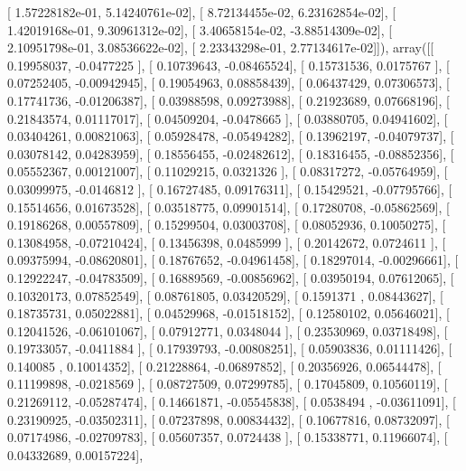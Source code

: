 \documentclass{article}
\begin{document}
       [  1.57228182e-01,   5.14240761e-02],
       [  8.72134455e-02,   6.23162854e-02],
       [  1.42019168e-01,   9.30961312e-02],
       [  3.40658154e-02,  -3.88514309e-02],
       [  2.10951798e-01,   3.08536622e-02],
       [  2.23343298e-01,   2.77134617e-02]]), array([[ 0.19958037, -0.0477225 ],
       [ 0.10739643, -0.08465524],
       [ 0.15731536,  0.0175767 ],
       [ 0.07252405, -0.00942945],
       [ 0.19054963,  0.08858439],
       [ 0.06437429,  0.07306573],
       [ 0.17741736, -0.01206387],
       [ 0.03988598,  0.09273988],
       [ 0.21923689,  0.07668196],
       [ 0.21843574,  0.01117017],
       [ 0.04509204, -0.0478665 ],
       [ 0.03880705,  0.04941602],
       [ 0.03404261,  0.00821063],
       [ 0.05928478, -0.05494282],
       [ 0.13962197, -0.04079737],
       [ 0.03078142,  0.04283959],
       [ 0.18556455, -0.02482612],
       [ 0.18316455, -0.08852356],
       [ 0.05552367,  0.00121007],
       [ 0.11029215,  0.0321326 ],
       [ 0.08317272, -0.05764959],
       [ 0.03099975, -0.0146812 ],
       [ 0.16727485,  0.09176311],
       [ 0.15429521, -0.07795766],
       [ 0.15514656,  0.01673528],
       [ 0.03518775,  0.09901514],
       [ 0.17280708, -0.05862569],
       [ 0.19186268,  0.00557809],
       [ 0.15299504,  0.03003708],
       [ 0.08052936,  0.10050275],
       [ 0.13084958, -0.07210424],
       [ 0.13456398,  0.0485999 ],
       [ 0.20142672,  0.0724611 ],
       [ 0.09375994, -0.08620801],
       [ 0.18767652, -0.04961458],
       [ 0.18297014, -0.00296661],
       [ 0.12922247, -0.04783509],
       [ 0.16889569, -0.00856962],
       [ 0.03950194,  0.07612065],
       [ 0.10320173,  0.07852549],
       [ 0.08761805,  0.03420529],
       [ 0.1591371 ,  0.08443627],
       [ 0.18735731,  0.05022881],
       [ 0.04529968, -0.01518152],
       [ 0.12580102,  0.05646021],
       [ 0.12041526, -0.06101067],
       [ 0.07912771,  0.0348044 ],
       [ 0.23530969,  0.03718498],
       [ 0.19733057, -0.0411884 ],
       [ 0.17939793, -0.00808251],
       [ 0.05903836,  0.01111426],
       [ 0.140085  ,  0.10014352],
       [ 0.21228864, -0.06897852],
       [ 0.20356926,  0.06544478],
       [ 0.11199898, -0.0218569 ],
       [ 0.08727509,  0.07299785],
       [ 0.17045809,  0.10560119],
       [ 0.21269112, -0.05287474],
       [ 0.14661871, -0.05545838],
       [ 0.0538494 , -0.03611091],
       [ 0.23190925, -0.03502311],
       [ 0.07237898,  0.00834432],
       [ 0.10677816,  0.08732097],
       [ 0.07174986, -0.02709783],
       [ 0.05607357,  0.0724438 ],
       [ 0.15338771,  0.11966074],
       [ 0.04332689,  0.00157224],
\end{document}
